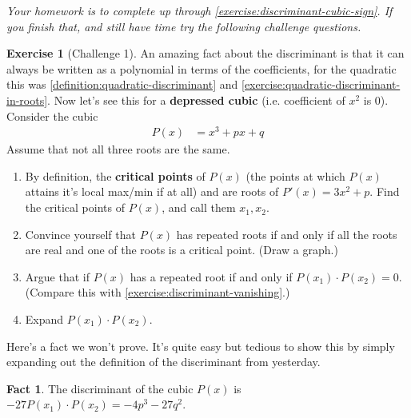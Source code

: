 \documentclass[reqno, 12pt, letter]{article}
\theoremstyle{plain}
\theoremstyle{definition}
\newtheorem{exercise}[theorem]{Exercise}
\newtheorem{fact}[theorem]{Fact}
\theoremstyle{remark}
\numberwithin{equation}{section}
\begin{document}

{\it Your homework is to complete up through \autoref{exercise:discriminant-cubic-sign}. If you finish that, and still have time try the following challenge questions.}

\begin{exercise}[Challenge 1]
	\label{exercise:cubic-discriminant}
	An amazing fact about the discriminant is that it can always be written as a polynomial in terms of the coefficients, for the quadratic this was \autoref{definition:quadratic-discriminant} and \autoref{exercise:quadratic-discriminant-in-roots}. Now let's see this for a \textbf{depressed cubic} (i.e. coefficient of $ x^2$ is 0). Consider the cubic
	\begin{align*}
		P(x) &= x^3 + px + q
	\end{align*}
Assume that not all three roots are the same. 
	\begin{enumerate}
		\item By definition, the {\bf critical points} of $P(x)$ (the points at which $ P(x)$ attains it's local max/min if at all) and are roots of $P'(x) = 3x^2 + p$. Find the critical points of $ P(x)$, and call them $ x_1, x_2$.
		\item Convince yourself that $ P(x)$ has repeated roots if and only if all the roots are real and one of the roots is a critical point. (Draw a graph.)
		\item Argue that if $ P(x)$ has a repeated root if and only if $ P(x_1) \cdot P(x_2) = 0$. (Compare this with \autoref{exercise:discriminant-vanishing}.)
		\item Expand $ P(x_1) \cdot P(x_2)$.
	\end{enumerate}
	Here's a fact we won't prove. It's quite easy but tedious to show this by simply expanding out the definition of the discriminant from yesterday.
	\begin{fact}
		The discriminant of the cubic $ P(x)$ is $ -27P(x_1) \cdot P(x_2) = -4p^3 - 27q^2$.
	\end{fact}
\end{exercise}
\end{document}
